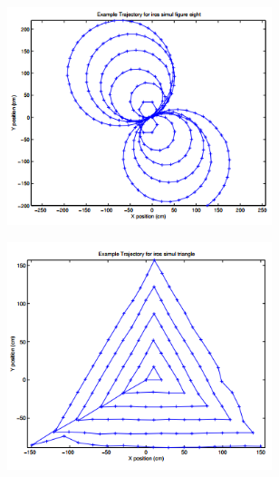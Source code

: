 \begin{figure}
\begin{subfigure}[b]{0.498\textwidth}
		\caption{}
	\end{subfigure}
	\begin{subfigure}[b]{0.498\textwidth}
	    \centering
		\includegraphics[width=0.85\textwidth, height=0.85\textwidth]{images/eight.png}
		\label{subfig:c}
		\caption{}
	\end{subfigure}
	\begin{subfigure}[b]{0.498\textwidth}
	    \centering
		\includegraphics[width=0.85\textwidth, height=0.85\textwidth]{images/triangle.png}

\end{subfigure}
\end{figure}
